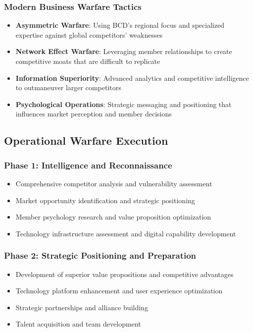 \subsubsection{Modern Business Warfare Tactics}

\begin{itemize}
    \item \textbf{Asymmetric Warfare}: Using BCD's regional focus and specialized expertise against global competitors' weaknesses
    \item \textbf{Network Effect Warfare}: Leveraging member relationships to create competitive moats that are difficult to replicate
    \item \textbf{Information Superiority}: Advanced analytics and competitive intelligence to outmaneuver larger competitors
    \item \textbf{Psychological Operations}: Strategic messaging and positioning that influences market perception and member decisions
\end{itemize}

\subsection{Operational Warfare Execution}

\subsubsection{Phase 1: Intelligence and Reconnaissance}
\begin{itemize}
    \item Comprehensive competitor analysis and vulnerability assessment
    \item Market opportunity identification and strategic positioning
    \item Member psychology research and value proposition optimization
    \item Technology infrastructure assessment and digital capability development
\end{itemize}

\subsubsection{Phase 2: Strategic Positioning and Preparation}
\begin{itemize}
    \item Development of superior value propositions and competitive advantages
    \item Technology platform enhancement and user experience optimization
    \item Strategic partnerships and alliance building
    \item Talent acquisition and team development
\end{itemize}

